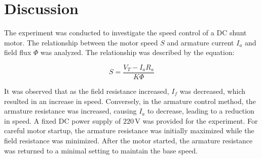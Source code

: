 \documentclass[a4paper,12pt]{article}
\begin{document}
\section{Discussion}

The experiment was conducted to investigate the speed control of a DC shunt motor. The relationship between the motor speed \( S \) and armature current \( I_a \) and field flux \( \Phi \) was analyzed. The relationship was described by the equation:

\[
S = \frac{V_T - I_a R_a}{K \Phi}
\]

It was observed that as the field resistance increased, \( I_f \) was decreased, which resulted in an increase in speed. Conversely, in the armature control method, the armature resistance was increased, causing \( I_a \) to decrease, leading to a reduction in speed. 
A fixed DC power supply of \( 220 \, \text{V} \) was provided for the experiment.
For careful motor startup, the armature resistance was initially maximized while the field resistance was minimized. After the motor started, the armature resistance was returned to a minimal setting to maintain the base speed.
\end{document}

